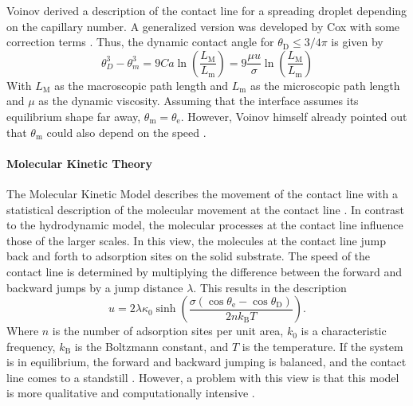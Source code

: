 Voinov \cite{voinovHydrodynamicsWetting1977} derived a description of the contact line for a spreading droplet depending on the capillary number. A generalized version was developed by Cox \cite{cox1986DynamicsSpreadingLiquids} with some correction terms \cite{carlsonCapillarityDynamicWetting2012,blake2006PhysicsMovingWetting}. Thus, the dynamic contact angle for $\theta_{\mathrm{D}} \leq 3/4 \pi$ is given by
\begin{equation}
    \label{eq: Cox-Voinov}
    \theta_D^3-\theta_m^3= 9 Ca \ln\left(\frac{L_{\mathrm{M}}}{L_{\mathrm{m}}}\right) = 9 \frac{\mu u}{\sigma}\ln\left(\frac{L_{\mathrm{M}}}{L_{\mathrm{m}}}\right)
\end{equation}
With $L_{\mathrm{M}}$ as the macroscopic path length and $L_{\mathrm{m}}$ as the microscopic path length and $\mu$ as the dynamic viscosity. Assuming that the interface assumes its equilibrium shape far away, $\theta_{\mathrm{m}} = \theta_{\mathrm{e}}$. However, Voinov himself already pointed out that $\theta_{\mathrm{m}}$ could also depend on the speed \cite{voinovHydrodynamicsWetting1977,blake2006PhysicsMovingWetting,lacisNanoscaleShearedDroplet2022}.


\paragraph{Molecular Kinetic Theory}
The Molecular Kinetic Model describes the movement of the contact line with a statistical description of the molecular movement at the contact line \cite{blake1969KineticsDisplacement}. 
In contrast to the hydrodynamic model, the molecular processes at the contact line influence those of the larger scales. In this view, the molecules at the contact line jump back and forth to adsorption sites on the solid substrate. The speed of the contact line is determined by multiplying the difference between the forward and backward jumps by a jump distance $\lambda$. This results in the description
\begin{equation}
    u=2\lambda\kappa_{0}\sinh\left(\frac{\sigma\left(\cos\theta_{\mathrm{e}}-\cos\theta_{\mathrm{D}}\right)}{2nk_{\mathrm{B}}T}\right).
\end{equation}
Where $n$ is the number of adsorption sites per unit area, $k_0$ is a characteristic frequency, $k_{\mathrm{B}}$ is the Boltzmann constant, and $T$ is the temperature.
If the system is in equilibrium, the forward and backward jumping is balanced, and the contact line comes to a standstill \cite{carlson2011DissipationRapidDynamic,blake2006PhysicsMovingWetting}. However, a problem with this view is that this model is more qualitative and computationally intensive \cite{mohammadkarim2022ReviewPhysicsMoving}.








